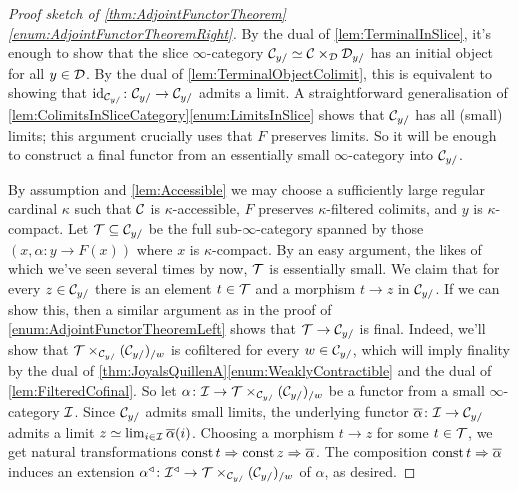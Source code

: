 \begin{proof}[Proof sketch of \cref{thm:AdjointFunctorTheorem}\cref{enum:AdjointFunctorTheoremRight}]
	By the dual of \cref{lem:TerminalInSlice}, it's enough to show that the slice $\infty$-category $\mathcal{C}_{y/}\simeq \mathcal{C}\times_{\mathcal{D}}\mathcal{D}_{y/}$ has an initial object for all $y\in\mathcal{D}$. By the dual of \cref{lem:TerminalObjectColimit}, this is equivalent to showing that $\operatorname{id}_{\mathcal{C}_{y/}}\colon \mathcal{C}_{y/}\rightarrow\mathcal{C}_{y/}$ admits a limit. A straightforward generalisation of \cref{lem:ColimitsInSliceCategory}\cref{enum:LimitsInSlice} shows that $\mathcal{C}_{y/}$ has all (small) limits; this argument crucially uses that $F$ preserves limits. So it will be enough to construct a final functor from an essentially small $\infty$-category into $\mathcal{C}_{y/}$.
	
	By assumption and \cref{lem:Accessible} we may choose a sufficiently large regular cardinal $\kappa$ such that $\mathcal{C}$ is $\kappa$-accessible, $F$ preserves $\kappa$-filtered colimits, and $y$ is $\kappa$-compact. Let $\mathcal{T}\subseteq\mathcal{C}_{y/}$ be the full sub-$\infty$-category spanned by those $(x, \alpha\colon y\rightarrow F(x))$ where $x$ is $\kappa$-compact. By an easy argument, the likes of which we've seen several times by now, $\mathcal{T}$ is essentially small. We claim that for every $z\in \mathcal{C}_{y/}$ there is an element $t\in \mathcal{T}$ and a morphism $t\rightarrow z$ in $\mathcal{C}_{y/}$. If we can show this, then a similar argument as in the proof of \cref{enum:AdjointFunctorTheoremLeft} shows that $\mathcal{T}\rightarrow\mathcal{C}_{y/}$ is final. Indeed, we'll show that $\mathcal{T}\times_{\mathcal{C}_{y/}}(\mathcal{C}_{y/})_{/w}$ is cofiltered for every $w\in \mathcal{C}_{y/}$, which will imply finality by the dual of \cref{thm:JoyalsQuillenA}\cref{enum:WeaklyContractible} and the dual of \cref{lem:FilteredCofinal}. So let $\alpha\colon \mathcal{I}\rightarrow \mathcal{T}\times_{\mathcal{C}_{y/}}(\mathcal{C}_{y/})_{/w}$ be a functor from a small $\infty$-category $\mathcal{I}$. Since $\mathcal{C}_{y/}$ admits small limits, the underlying functor $\ov\alpha\colon \Ii\rightarrow \Cc_{y/}$ admits a limit $z\simeq \limit_{i\in\Ii}\ov\alpha(i)$. Choosing a morphism $t\rightarrow z$ for some $t\in \mathcal{T}$, we get natural transformations $\const t\Rightarrow\const z\Rightarrow\ov\alpha$. The composition $\const t\Rightarrow \ov\alpha$ induces an extension $\alpha^\triangleleft\colon \mathcal{I}^\triangleleft\rightarrow \mathcal{T}\times_{\mathcal{C}_{y/}}(\mathcal{C}_{y/})_{/w}$ of $\alpha$, as desired.
	

\end{proof}

